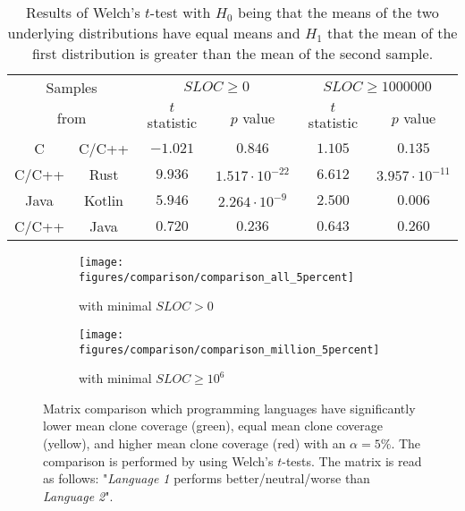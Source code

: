 \begin{table}[tbh!]
	\centering
	\begin{tabular}{|cc||c|c||c|c|}
		\hline
		\multicolumn{2}{|c||}{Samples} & \multicolumn{2}{c||}{$SLOC \geq 0$} & \multicolumn{2}{c|}{$SLOC \geq 1000000$}  \\
		\multicolumn{2}{|c||}{from} & \multicolumn{1}{c}{$t$ statistic} & \multicolumn{1}{c||}{$p$ value} & \multicolumn{1}{c}{$t$ statistic} & $p$ value \\
		\hline
		\hline
		C & C/C++ & $-1.021$ & $0.846$ & $1.105$ & $0.135$ \\
		\hline
		\hline
		C/C++ & Rust & $9.936$ & $1.517 \cdot 10^{-22}$ & $6.612$ & $3.957 \cdot 10^{-11}$ \\
		\hline
		Java & Kotlin & $5.946$ & $2.264 \cdot 10^{-9}$ & $2.500$ & $0.006$ \\
		\hline
		\hline
		C/C++ & Java & $0.720$ & $0.236$ & $0.643$ & $0.260$ \\
		\hline
	\end{tabular}
	\caption{Results of Welch's $t$-test with $H_0$ being that the means of the two underlying distributions have equal means and $H_1$ that the mean of the first distribution is greater than the mean of the second sample.}
	\label{tab:stat_test}
\end{table}

\begin{figure}[tbh!]
	\centering
	\begin{subfigure}[t]{0.49\textwidth}
		\texttt{[image: figures/comparison/comparison\_all\_5percent]}
		\caption{with minimal $SLOC > 0$}
		\label{fig:matrix_comp_all}
	\end{subfigure}
	\hfill
	\begin{subfigure}[t]{0.49\textwidth}
		\texttt{[image: figures/comparison/comparison\_million\_5percent]}
		\caption{with minimal $SLOC \geq 10^{6}$}
		\label{fig:matrix_comp_million}
	\end{subfigure}
	\caption{Matrix comparison which programming languages have significantly lower mean clone coverage (green), equal mean clone coverage (yellow), and higher mean clone coverage (red) with an $\alpha=5\%$. The comparison is performed by using Welch's $t$-tests. The matrix is read as follows: "\textit{Language 1} performs better/neutral/worse than \textit{Language 2}".}
	\label{fig:matrix_comp}
\end{figure}

